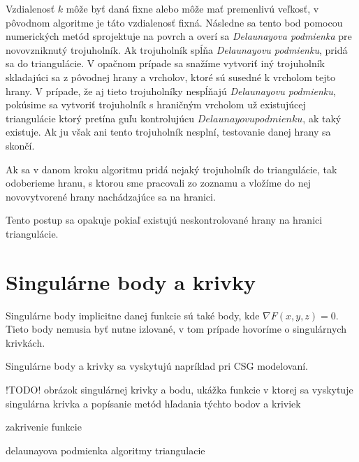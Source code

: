 Vzdialenosť $k$ môže byť daná fixne alebo môže mať premenlivú veľkosť, v pôvodnom algoritme je táto vzdialenosť fixná. 
Následne sa tento bod pomocou numerických metód sprojektuje na povrch a overí sa \textit{Delaunayova podmienka} pre novovzniknutý 
trojuholník. 
Ak trojuholník spĺňa \textit{Delaunayovu podmienku}, pridá sa do triangulácie. V opačnom prípade sa snažíme vytvoriť iný trojuholník 
skladajúci sa z pôvodnej hrany a vrcholov, ktoré sú susedné k vrcholom tejto hrany. V prípade, že aj tieto trojuholníky nespĺňajú 
\textit{Delaunayovu podmienku}, pokúsime sa vytvoriť trojuholník s hraničným vrcholom už existujúcej triangulácie ktorý pretína
guľu kontrolujúcu $Delaunayovu podmienku$, ak taký existuje. Ak ju však ani tento trojuholník nesplní, testovanie danej hrany sa skončí.

Ak sa v danom kroku algoritmu pridá nejaký trojuholník do triangulácie, tak odoberieme hranu, s ktorou sme pracovali zo zoznamu a 
vložíme do nej novovytvorené hrany nachádzajúce sa na hranici.

Tento postup sa opakuje pokiaľ existujú neskontrolované hrany na hranici triangulácie.

\newpage

\section{Singulárne body a krivky}

Singulárne body implicitne danej funkcie sú také body, kde $\nabla F(x, y, z) = 0$. Tieto body nemusia byť nutne izlované, 
v tom prípade hovoríme o singulárnych krivkách. 

Singulárne body a krivky sa vyskytujú napríklad pri CSG modelovaní.

\medskip

!TODO! obrázok singulárnej krivky a bodu, ukážka funkcie v ktorej sa vyskytuje singulárna 
krivka a popísanie metód hľadania týchto bodov a kriviek

\medskip

zakrivenie funkcie



delaunayova podmienka
algoritmy triangulacie







